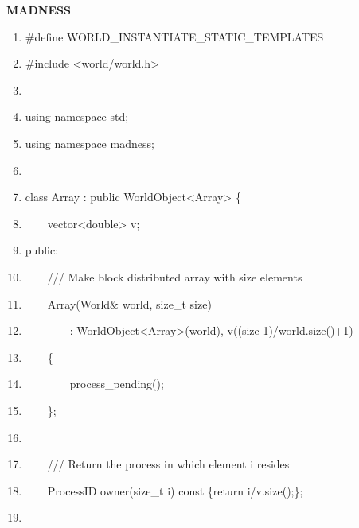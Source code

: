 \documentclass[letterpaper]{article}
\title{}
\author{Robert Harrison}
\date{2009-12-14}
\newcommand\liststyleLi{%
\renewcommand\theenumi{\arabic{enumi}}
\renewcommand\theenumii{\arabic{enumii}}
\renewcommand\theenumiii{\arabic{enumiii}}
\renewcommand\theenumiv{\arabic{enumiv}}
\renewcommand\labelenumi{\theenumi.}
\renewcommand\labelenumii{\theenumii.}
\renewcommand\labelenumiii{\theenumiii.}
\renewcommand\labelenumiv{\theenumiv.}
}
\begin{document}
\clearpage\setcounter{page}{1}\pagestyle{Licensepage}
\thispagestyle{Titlepage}

\bigskip


\bigskip


\bigskip


\bigskip


\bigskip


\bigskip


\bigskip


\bigskip


\bigskip

{\centering\bfseries
MADNESS
\par}

\begin{center}
\begin{minipage}{}
\liststyleLi
\begin{enumerate}
\item {\ttfamily
\#define WORLD\_INSTANTIATE\_STATIC\_TEMPLATES}
\item {\ttfamily
\#include {\textless}world/world.h{\textgreater}}
\item 
\bigskip
\item {\ttfamily
using namespace std;}
\item {\ttfamily
using namespace madness;}
\item 
\bigskip
\item {\ttfamily
class Array : public WorldObject{\textless}Array{\textgreater} \{}
\item {\ttfamily
\ \ \ \ vector{\textless}double{\textgreater} v;}
\item {\ttfamily
public:}
\item {\ttfamily
\ \ \ \ /// Make block distributed array with size elements}
\item {\ttfamily
\ \ \ \ Array(World\& world, size\_t size) }
\item {\ttfamily
\ \ \ \ \ \ \ \ : WorldObject{\textless}Array{\textgreater}(world), v((size-1)/world.size()+1)}
\item {\ttfamily
\ \ \ \ \{}
\item {\ttfamily
\ \ \ \ \ \ \ \ process\_pending();}
\item {\ttfamily
\ \ \ \ \};}
\item 
\bigskip
\item {\ttfamily
\ \ \ \ /// Return the process in which element i resides}
\item {\ttfamily
\ \ \ \ ProcessID owner(size\_t i) const \{return i/v.size();\};}
\item 

\end{enumerate}
\end{minipage}
\end{center}
\end{document}
